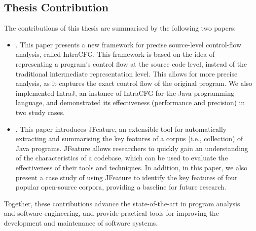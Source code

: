 \subsection*{Thesis Contribution}

The contributions of this thesis are summarised by the following two papers:

\begin{itemize}
	\item \paperIref.
	This paper presents a new framework for precise source-level control-flow 
	analysis, called IntraCFG. This framework is based on the idea of 
	representing a program's control flow at the source code level, instead of 
	the traditional intermediate representation level. This allows for more 
	precise analysis, as it captures the exact control flow of the original program.
    We also implemented IntraJ, an instance of IntraCFG for the Java programming 
	language, and demonstrated its effectiveness (performance and precision) in 
	two study cases.

	\item \paperIIref.
	This paper introduces JFeature, an extensible tool for automatically extracting and summarising
	the key features of a corpus (i.e., collection) of Java programs. JFeature 
	allows researchers to quickly gain an understanding of the characteristics of a codebase, 
	which can be used to evaluate the effectiveness of their tools and techniques.
	In addition, in this paper, we also present a case study of using JFeature to
	identify the key features of four popular open-source corpora, providing a
	baseline for future research.
\end{itemize}

Together, these contributions advance the state-of-the-art in program analysis 
and software engineering, and provide practical tools for improving the development
and maintenance of software systems.
